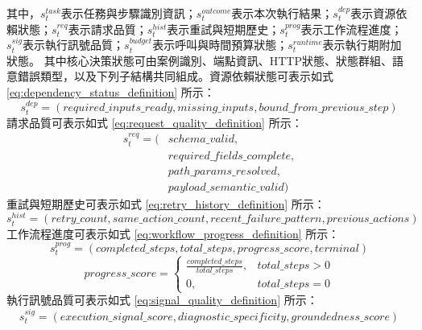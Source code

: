 \begin{ZhChapter}
\text 其中，$s_t^{task}$表示任務與步驟識別資訊；$s_t^{outcome}$表示本次執行結果；$s_t^{dep}$表示資源依賴狀態；$s_t^{req}$表示請求品質；$s_t^{hist}$表示重試與短期歷史；$s_t^{prog}$表示工作流程進度；$s_t^{sig}$表示執行訊號品質；$s_t^{budget}$表示呼叫與時間預算狀態；$s_t^{runtime}$表示執行期附加狀態。
\text 其中核心決策狀態可由案例識別、端點資訊、HTTP狀態、狀態群組、語意錯誤類型，以及下列子結構共同組成。資源依賴狀態可表示如式 \eqref{eq:dependency_status_definition} 所示：
\begin{equation}
\label{eq:dependency_status_definition}
s_t^{dep}=
(
required\_inputs\_ready,
missing\_inputs,
bound\_from\_previous\_step
)
\end{equation}
\text 請求品質可表示如式 \eqref{eq:request_quality_definition} 所示：
\begin{equation}
\label{eq:request_quality_definition}
\begin{aligned}
s_t^{req}=
(&schema\_valid,\\
&required\_fields\_complete,\\
&path\_params\_resolved,\\
&payload\_semantic\_valid)
\end{aligned}
\end{equation}
\text 重試與短期歷史可表示如式 \eqref{eq:retry_history_definition} 所示：
\begin{equation}
\label{eq:retry_history_definition}
s_t^{hist}=
(
retry\_count,
same\_action\_count,
recent\_failure\_pattern,
previous\_actions
)
\end{equation}
\text 工作流程進度可表示如式 \eqref{eq:workflow_progress_definition} 所示：
\begin{equation}
\label{eq:workflow_progress_definition}
s_t^{prog}=
(
completed\_steps,
total\_steps,
progress\_score,
terminal
)
\end{equation}
\begin{equation}
\label{eq:workflow_progress_score_definition}
progress\_score=
\begin{cases}
\frac{completed\_steps}{total\_steps}, & total\_steps > 0\\
0, & total\_steps = 0
\end{cases}
\end{equation}
\text 執行訊號品質可表示如式 \eqref{eq:signal_quality_definition} 所示：
\begin{equation}
\label{eq:signal_quality_definition}
s_t^{sig}=
(
execution\_signal\_score,
diagnostic\_specificity,
groundedness\_score
)
\end{equation}

\end{ZhChapter}
